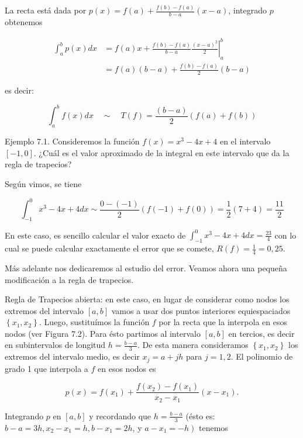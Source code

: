 \documentclass[10pt]{article}
\begin{document}
La recta está dada por $p(x)=f(a)+\frac{f(b)-f(a)}{b-a}(x-a)$, integrado $p$ obtenemos

$$
\begin{aligned}
\int_{a}^{b} p(x) d x & =f(a) x+\left.\frac{f(b)-f(a)}{b-a} \frac{(x-a)^{2}}{2}\right|_{a} ^{b} \\
& =f(a)(b-a)+\frac{f(b)-f(a)}{2}(b-a)
\end{aligned}
$$

es decir:


\begin{equation*}
\int_{a}^{b} f(x) d x \quad \sim \quad T(f)=\frac{(b-a)}{2}(f(a)+f(b)) \tag{7.2}
\end{equation*}


Ejemplo 7.1. Consideremos la función $f(x)=x^{3}-4 x+4$ en el intervalo $[-1,0]$. ¿Cuál es el valor aproximado de la integral en este intervalo que da la regla de trapecios?

Según vimos, se tiene

$$
\int_{-1}^{0} x^{3}-4 x+4 d x \sim \frac{0-(-1)}{2}(f(-1)+f(0))=\frac{1}{2}(7+4)=\frac{11}{2}
$$

En este caso, es sencillo calcular el valor exacto de $\int_{-1}^{0} x^{3}-4 x+4 d x=\frac{23}{4}$ con lo cual se puede calcular exactamente el error que se comete, $R(f)=\frac{1}{4}=0,25$.

Más adelante nos dedicaremos al estudio del error. Veamos ahora una pequeña modificación a la regla de trapecios.

Regla de Trapecios abierta: en este caso, en lugar de considerar como nodos los extremos del intervalo $[a, b]$ vamos a usar dos puntos interiores equiespaciados $\left\{x_{1}, x_{2}\right\}$. Luego, sustituímos la función $f$ por la recta que la interpola en esos nodos (ver Figura 7.2). Para ésto partimos al intervalo $[a, b]$ en tercios, es decir en subintervalos de longitud $h=\frac{b-a}{3}$. De esta manera consideramos $\left\{x_{1}, x_{2}\right\}$ los extremos del intervalo medio, es decir $x_{j}=a+j h$ para $j=1,2$. El polinomio de grado 1 que interpola a $f$ en esos nodos es

$$
p(x)=f\left(x_{1}\right)+\frac{f\left(x_{2}\right)-f\left(x_{1}\right)}{x_{2}-x_{1}}\left(x-x_{1}\right) .
$$

Integrando $p$ en $[a, b]$ y recordando que $h=\frac{b-a}{3}$ (ésto es: $b-a=3 h, x_{2}-x_{1}=h, b-x_{1}=2 h$, y $\left.a-x_{1}=-h\right)$ tenemos
\end{document}
